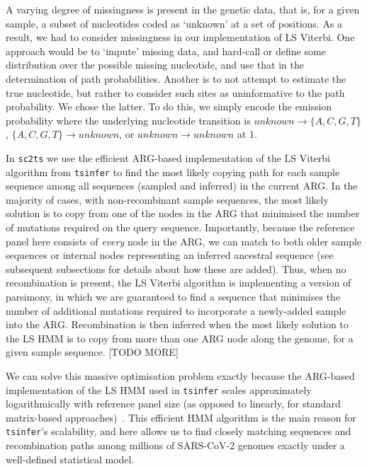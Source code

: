 \documentclass{article}
\begin{document}
A varying degree of missingness is present in the genetic data, that is, for a given sample, a subset of nucleotides coded as `unknown' at a set of positions. As a result, we had to consider missingness in our implementation of LS Viterbi. One approach would be to `impute' missing data, and hard-call or define some distribution over the possible missing nucleotide, and use that in the determination of path probabilities. Another is to not attempt to estimate the true nucleotide, but rather to consider such sites as uninformative to the path probability. We chose the latter. To do this, we simply encode the emission probability where the underlying nucleotide transition is $\mathit{unknown}\rightarrow \{A,C,G,T\}$, $\{A,C,G,T\}\rightarrow\mathit{unknown}$, or $\mathit{unknown}\rightarrow\mathit{unknown}$ at 1.


In \texttt{sc2ts} we use the efficient ARG-based implementation of the
LS Viterbi algorithm from \texttt{tsinfer} \citep{Kelleher2019-ba} to find
the most likely copying path for each sample sequence
among all sequences (sampled and inferred) in the current ARG.
In the majority of cases, with non-recombinant sample sequences,
the most likely solution is to copy from one
of the nodes in the ARG that minimised the number of mutations required
on the query sequence. Importantly, because the reference panel here consists of
\emph{every} node in the ARG, we can match to both older sample
sequences or internal nodes representing an inferred ancestral sequence
(see subsequent subsections for details about how these are added).
Thus, when no recombination is present, the LS Viterbi algorithm is
implementing a version of parsimony, in which we are guaranteed to
find a sequence that minimises the number of additional mutations required
to incorporate a newly-added sample into the ARG.
Recombination is then inferred when the most likely solution to the LS
HMM is to copy from more than one ARG node along the genome, for a
given sample sequence. [TODO MORE]

We can solve this massive optimisation problem exactly because the ARG-based
implementation of the LS HMM used in \texttt{tsinfer} scales approximately
logarithmically with reference panel size (as opposed to linearly,
for standard matrix-based approaches)~\citep{Kelleher2019-ba}.
This efficient HMM algorithm is the main reason for \texttt{tsinfer}'s
scalability, and here allows us to find closely matching
sequences and recombination paths among millions of SARS-CoV-2
genomes exactly under a well-defined statistical model.
\end{document}
